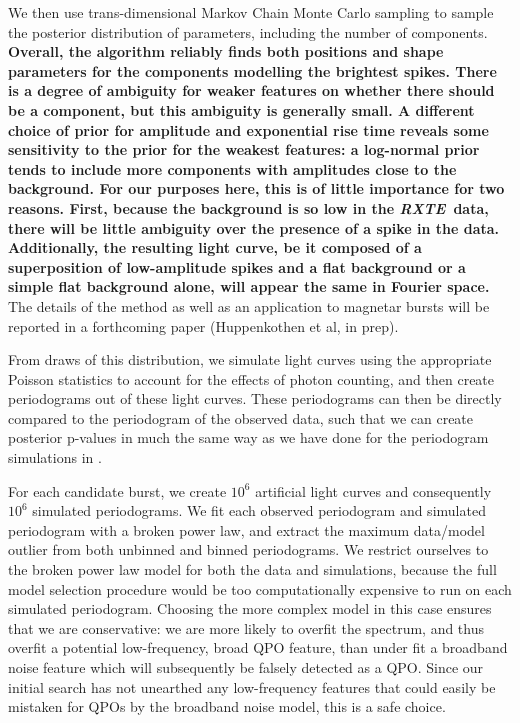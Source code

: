 \documentclass[numberedappendix]{emulateapj}
\newcommand{\project}[1]{\textsl{#1}}
\newcommand{\rxte}{\project{RXTE}}
\begin{document}
We then use trans-dimensional Markov Chain Monte Carlo sampling \citep[in the form of diffusive nested sampling; ][]{brewer2011} to sample the posterior distribution of parameters, including the number of components. \textbf{Overall, the algorithm reliably finds both positions and shape parameters for the components modelling the brightest spikes. There is a degree of ambiguity for weaker features on whether there should be a component, but this ambiguity is generally small. A different choice of prior for amplitude and exponential rise time reveals some sensitivity to the prior for the weakest features: a log-normal prior tends to include more components with amplitudes close to the background. For our purposes here, this is of little importance for two reasons. First, because the background is so low in the \rxte\ data, there will be little ambiguity over the presence of a spike in the data. Additionally, the resulting light curve, be it composed of a superposition of low-amplitude spikes and a flat background or a simple flat background alone, will appear the same in Fourier space.} The details of the method as well as an application to magnetar bursts will be reported in a forthcoming paper (Huppenkothen et al, in prep). 

From draws of this distribution, we simulate light curves using the appropriate Poisson statistics to account for the effects of photon counting, and then create periodograms out of these light curves. These periodograms can then be directly compared to the periodogram of the observed data, such that we can create posterior p-values in much the same way as we have done for the periodogram simulations in \citep{huppenkothen2013}. 

For each candidate burst, we create $10^6$ artificial light curves and consequently $10^6$ simulated periodograms. We fit each observed periodogram and simulated periodogram with a broken power law, and extract the maximum data/model outlier from both unbinned and binned periodograms. We restrict ourselves to the broken power law model for both the data and simulations, because the full model selection procedure would be too computationally expensive to run on each simulated periodogram. Choosing the more complex model in this case ensures that we are conservative: we are more likely to overfit the spectrum, and thus overfit a potential low-frequency, broad QPO feature, than under fit a broadband noise feature which will subsequently be falsely detected as a QPO. Since our initial search has not unearthed any low-frequency features that could easily be mistaken for QPOs by the broadband noise model, this is a safe choice.
\end{document}
